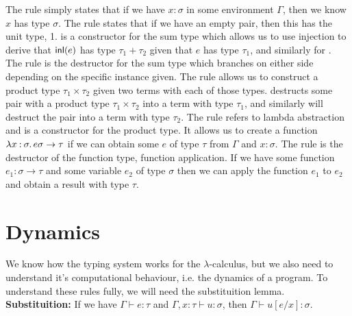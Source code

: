 \noindent
The  rule simply states that if we have $x: \sigma$ in some environment $\Gamma$, 
then we know $x$ has type $\sigma$. The  rule states that if we have an empty pair, then this has 
the unit type, 1.  is a constructor for the sum type which allows us to use injection 
to derive that $\textsf{inl}(e)$ has type $\tau_1 + \tau_2$ given that $e$ has type $\tau_1$, and similarly for 
. The  rule is the destructor for the sum type which branches on either
side depending on the specific instance given. %
The  rule allows us to construct a product type $\tau_1 \times \tau_2$ given two terms 
with each of those types.  destructs some pair with a product type $\tau_1 \times \tau_2$ 
into a term with type $\tau_1$, and similarly  will destruct the pair into a term 
with type $\tau_2$. 
The  rule refers to lambda abstraction and is a constructor for the product type. It allows
us to create a function $\Lam{x}[\sigma]{e} \sigma \rightarrow \tau$ if we can obtain some $e$ of type $\tau$
from $\Gamma$ and $ x: \sigma$. The  rule is the destructor of the function type, function 
application. If we have some function $e_1: \sigma \rightarrow \tau$ and some variable $e_2$ of type 
$\sigma$ then we can apply the function $e_1$ to $e_2$ and obtain a result with type $\tau$.
\\

\section{Dynamics}

\noindent
We know how the typing system works for the $\lambda$-calculus, but we also need to understand 
it's computational behaviour, i.e. the dynamics of a program. To understand these rules fully, we 
will need the substituition lemma. \\

\noindent
\textbf{Substituition:} If we have $\Gamma \vdash e: \tau$ and $\Gamma, x: \tau \vdash u: \sigma$, 
then $\Gamma \vdash u[e/x]: \sigma$. 

